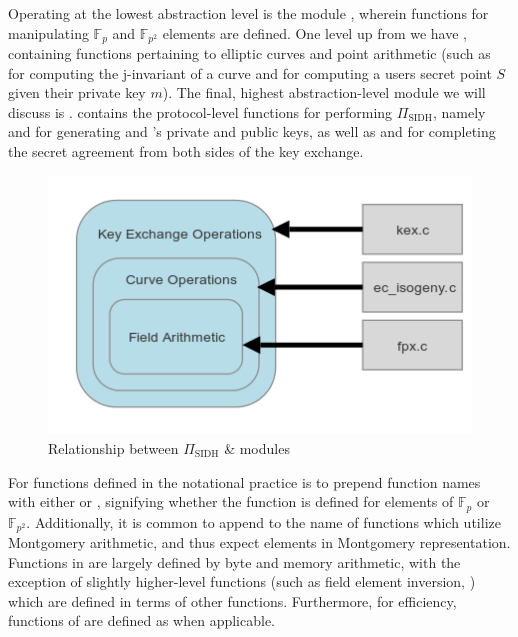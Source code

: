 Operating at the lowest abstraction level is the module , wherein functions for manipulating $\mathbb{F}_{p}$ and $\mathbb{F}_{p^2}$ elements are defined. One level up from  we have , containing functions pertaining to elliptic curves and point arithmetic (such as  for computing the j-invariant of a curve and  for computing a users secret point $S$ given their private key $m$). The final, highest abstraction-level module we will discuss is .  contains the protocol-level functions for performing $\Pi_{\text{SIDH}}$, namely  and  for generating \alice and \bob's private and public keys, as well as  and  for completing the secret agreement from both sides of the key exchange.

\begin{figure}[!htb]
\centering
\includegraphics[scale=0.7]{halfmapwcurve.png} %
\caption{Relationship between $\Pi_{\text{SIDH}}$ \& \sidh modules}
\label{fig:halfmap} %
\end{figure}

For functions defined in  the notational practice is to prepend function names with either  or , signifying whether the function is defined for elements of $\mathbb{F}_{p}$ or $\mathbb{F}_{p^2}$. Additionally, it is common to append  to the name of functions which utilize Montgomery arithmetic, and thus expect elements in Montgomery representation. Functions in  are largely defined by byte and memory arithmetic, with the exception of slightly higher-level functions (such as field element inversion, ) which are defined in terms of other  functions. Furthermore, for efficiency, functions of  are defined as  when applicable.

